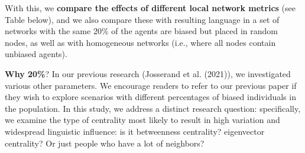 \documentclass[
]{article}
\begin{document}
With this, we \textbf{compare the effects of different local network
metrics} (see Table below), and we also compare these with resulting
language in a set of networks with the same 20\% of the agents are
biased but placed in random nodes, as well as with homogeneous networks
(i.e., where all nodes contain unbiased agents).

\textbf{Why 20\%}? In our previous research (Josserand et al. (2021)),
we investigated various other parameters. We encourage readers to refer
to our previous paper if they wish to explore scenarios with different
percentages of biased individuals in the population. In this study, we
address a distinct research question: specifically, we examine the type
of centrality most likely to result in high variation and widespread
linguistic influence: is it betweenness centrality? eigenvector
centrality? Or just people who have a lot of neighbors?
\end{document}
